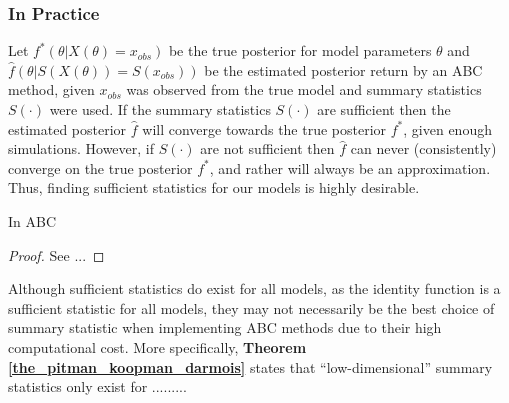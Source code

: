 \documentclass[11pt,a4paper,margin=0]{article}
\theoremstyle{break}
\begin{document}


\subsubsection*{In Practice}
  \par Let $f^*(\theta|X(\theta)=x_{obs})$ be the true posterior for model parameters $\theta$ and $\hat{f}(\theta|S(X(\theta))=S(x_{obs}))$ be the estimated posterior return by an ABC method, given $x_{obs}$ was observed from the true model and summary statistics $S(\cdot)$ were used. If the summary statistics $S(\cdot)$ are sufficient then the estimated posterior $\hat{f}$ will converge towards the true posterior $f^*$, given enough simulations. However, if $S(\cdot)$ are not sufficient then $\hat{f}$ can never (consistently) converge on the true posterior $f^*$, and rather will always be an approximation. Thus, finding sufficient statistics for our models is highly desirable.


  \par In ABC


  \begin{box_theorem}\label{the_pitman_koopman_darmois}
    \begin{proof}
      See ...
    \end{proof}
  \end{box_theorem}

  \par Although sufficient statistics do exist for all models, as the identity function is a sufficient statistic for all models, they may not necessarily be the best choice of summary statistic when implementing ABC methods due to their high computational cost. More specifically, \textbf{Theorem \ref{the_pitman_koopman_darmois}} states that ``low-dimensional'' summary statistics only exist for .........
\end{document}
